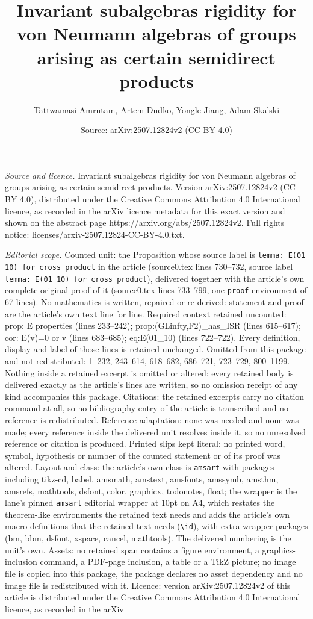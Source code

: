 \documentclass[10pt,a4paper]{amsart}
\title[Invariant subalgebras rigidity for von Neumann algebras of g]{Invariant subalgebras rigidity for von Neumann algebras of groups arising as certain semidirect products}
\author{Tattwamasi Amrutam, Artem Dudko, Yongle Jiang, Adam Skalski}
\date{Source: arXiv:2507.12824v2 (CC BY 4.0)}
\begin{document}
\maketitle

\noindent\emph{Source and licence.} Invariant subalgebras rigidity for von Neumann algebras of groups arising as certain semidirect products. Version arXiv:2507.12824v2 (CC BY 4.0), distributed under the Creative Commons Attribution 4.0 International licence, as recorded in the arXiv licence metadata for this exact version and shown on the abstract page https://arxiv.org/abs/2507.12824v2. Full rights notice: licenses/arxiv-2507.12824-CC-BY-4.0.txt.\par\smallskip

\noindent\textit{Editorial scope.} Counted unit: the Proposition whose source label is \texttt{lemma: E(01 10) for cross product} in the article (source0.tex lines 730--732, source label \texttt{lemma: E(01 10) for cross product}), delivered together with the article's own complete original proof of it (source0.tex lines 733--799, one \texttt{proof} environment of 67 lines). No mathematics is written, repaired or re-derived: statement and proof are the article's own text line for line. Required context retained uncounted: prop: E properties (lines 233--242); prop:(GLinfty,F2)\_has\_ISR (lines 615--617); cor: E(v)=0 or v (lines 683--685); eq:E(01\_10) (lines 722--722). Every definition, display and label of those lines is retained unchanged. Omitted from this package and not redistributed: 1--232, 243--614, 618--682, 686--721, 723--729, 800--1199. Nothing inside a retained excerpt is omitted or altered: every retained body is delivered exactly as the article's lines are written, so no omission receipt of any kind accompanies this package. Citations: the retained excerpts carry no citation command at all, so no bibliography entry of the article is transcribed and no reference is redistributed. Reference adaptation: none was needed and none was made; every reference inside the delivered unit resolves inside it, so no unresolved reference or citation is produced. Printed slips kept literal: no printed word, symbol, hypothesis or number of the counted statement or of its proof was altered. Layout and class: the article's own class is \texttt{amsart} with packages including tikz-cd, babel, amsmath, amstext, amsfonts, amssymb, amsthm, amsrefs, mathtools, dsfont, color, graphicx, todonotes, float; the wrapper is the lane's pinned \texttt{amsart} editorial wrapper at 10pt on A4, which restates the theorem-like environments the retained text needs and adds the article's own macro definitions that the retained text needs (\texttt{\textbackslash id}), with extra wrapper packages (bm, bbm, dsfont, xspace, cancel, mathtools). The delivered numbering is the unit's own. Assets: no retained span contains a figure environment, a graphics-inclusion command, a PDF-page inclusion, a table or a TikZ picture; no image file is copied into this package, the package declares no asset dependency and no image file is redistributed with it. Licence: version arXiv:2507.12824v2 of this article is distributed under the Creative Commons Attribution 4.0 International licence, as recorded in the arXiv 
\end{document}
